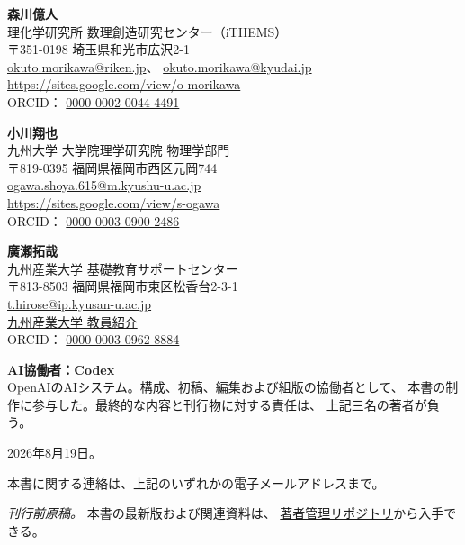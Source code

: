\clearpage
\thispagestyle{empty}

\vspace*{\fill}

{\small
\noindent
\textbf{森川億人}\\
理化学研究所 数理創造研究センター（iTHEMS）\\
〒351-0198 埼玉県和光市広沢2-1\\
\href{mailto:okuto.morikawa@riken.jp}
{okuto.morikawa@riken.jp}、
\href{mailto:okuto.morikawa@kyudai.jp}
{okuto.morikawa@kyudai.jp}\\
\url{https://sites.google.com/view/o-morikawa}\\
ORCID：
\href{https://orcid.org/0000-0002-0044-4491}
{0000-0002-0044-4491}

\bigskip

\noindent
\textbf{小川翔也}\\
九州大学 大学院理学研究院 物理学部門\\
〒819-0395 福岡県福岡市西区元岡744\\
\href{mailto:ogawa.shoya.615@m.kyushu-u.ac.jp}
{ogawa.shoya.615@m.kyushu-u.ac.jp}\\
\url{https://sites.google.com/view/s-ogawa}\\
ORCID：
\href{https://orcid.org/0000-0003-0900-2486}
{0000-0003-0900-2486}

\bigskip

\noindent
\textbf{廣瀬拓哉}\\
九州産業大学 基礎教育サポートセンター\\
〒813-8503 福岡県福岡市東区松香台2-3-1\\
\href{mailto;t.hirose@ip.kyusan-u.ac.jp}{t.hirose@ip.kyusan-u.ac.jp}\\
\href{https://ras2.kyusan-u.ac.jp/kyshp/k03/resid/S001907}
{九州産業大学 教員紹介}\\
ORCID：
\href{https://orcid.org/0000-0003-0962-8884}
{0000-0003-0962-8884}

\bigskip

\noindent
\textbf{AI協働者：Codex}\\
OpenAIのAIシステム。構成、初稿、編集および組版の協働者として、
本書の制作に参与した。最終的な内容と刊行物に対する責任は、
上記三名の著者が負う。

\bigskip

\noindent
2026年8月19日。

\medskip

\noindent
本書に関する連絡は、上記のいずれかの電子メールアドレスまで。

\medskip

\noindent
\textit{刊行前原稿。}
本書の最新版および関連資料は、
\href{https://drive.google.com/drive/folders/1bE54ZLT_4eVw0gg5K4qJEvqR-aRm_I25?usp=drive_link}
{著者管理リポジトリ}から入手できる。
}

\vspace*{\fill}
\clearpage
